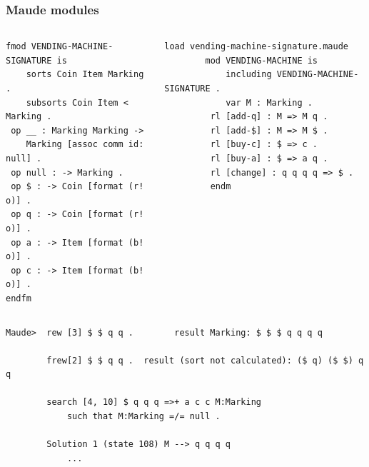 \documentclass{beamer}
\begin{document}
\begin{frame}[fragile]
    \frametitle{Maude modules}
    \scriptsize
    \begin{columns}
        \begin{column}{.5\textwidth}
            
            \begin{lstlisting}[language=maude]
 fmod VENDING-MACHINE-SIGNATURE is
    sorts Coin Item Marking .
    subsorts Coin Item < Marking .
 op __ : Marking Marking ->
    Marking [assoc comm id: null] .
 op null : -> Marking .
 op $ : -> Coin [format (r! o)] .
 op q : -> Coin [format (r! o)] .
 op a : -> Item [format (b! o)] .
 op c : -> Item [format (b! o)] .
endfm
            \end{lstlisting}
        \end{column}
        \begin{column}{.5\textwidth}
            \begin{lstlisting}[language=maude]
        load vending-machine-signature.maude
        mod VENDING-MACHINE is
            including VENDING-MACHINE-SIGNATURE .
            var M : Marking .
         rl [add-q] : M => M q .
         rl [add-$] : M => M $ .
         rl [buy-c] : $ => c .
         rl [buy-a] : $ => a q .
         rl [change] : q q q q => $ .
         endm
    \end{lstlisting}
        \end{column}
    \end{columns}
   \begin{lstlisting}[language=maude]
Maude>  rew [3] $ $ q q .        result Marking: $ $ $ q q q q
    
        frew[2] $ $ q q .  result (sort not calculated): ($ q) ($ $) q q                 
        
        search [4, 10] $ q q q =>+ a c c M:Marking 
            such that M:Marking =/= null .
        
        Solution 1 (state 108) M --> q q q q 
            ...
    \end{lstlisting} 
\end{frame}
\end{document}
